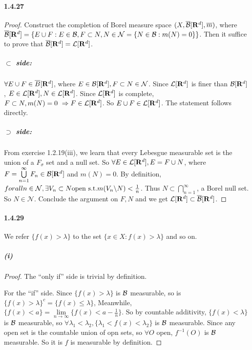 \documentclass{article}
\begin{document}
\paragraph{1.4.27}
\begin{proof}
Construct the completion of Borel measure space $(X,\overline{\mathcal{B}}[\mathbf{R}^d],\overline{m})$, where $\overline{\mathcal{B}}[\mathbf{R}^d]=\{E\cup F: E\in\mathcal{B}, F\subset N, N\in \mathcal{N}=\{N\in \mathcal{B}:m(N)=0\}\}$. Then it suffice to prove that $\overline{\mathcal{B}}[\mathbf{R}^d]=\mathcal{L}[\mathbf{R}^d]$.

\subparagraph{$\subset$ side:} $\forall E\cup F\in\overline{B}[\mathbf{R}^d]$, where $E\in \mathcal{B}[\mathbf{R}^d], F\subset N\in \mathcal{N}$. Since $\mathcal{L}[\mathbf{R}^d]$ is finer than $\mathcal{B}[\mathbf{R}^d]$, $E\in \mathcal{L}[\mathbf{R}^d], N\in\mathcal{L}[\mathbf{R}^d]$. Since $\mathcal{L}[\mathbf{R}^d]$ is complete, $F\subset N, m(N)=0\ \Rightarrow F\in\mathcal{L}[\mathbf{R}^d]$. So $E\cup F\in\mathcal{L}[\mathbf{R}^d]$. The statement follows directly.

\subparagraph{$\supset$ side:} From exercise 1.2.19(iii), we learn that every Lebesgue measurable set is the union of a $F_\sigma$ set and a null set. So $\forall E\in\mathcal{L}[\mathbf{R}^d], E=F\cup N$, where $F=\bigcup\limits_{n=1}^{\infty}F_n\in\mathcal{B}[\mathbf{R}^d]$ and $m(N)=0$. By definition, $forall n\in \mathcal{N}, \exists V_n\subset N \text{open}\text{ s.t.} m(V_n\backslash N)<\frac 1 n$. Thus $N\subset \bigcap\limits_{n=1}^{\infty}$, a Borel null set. So $N\in \mathcal{N}$. Conclude the argument on $F,N$ and we get $\mathcal{L}[\mathbf{R}^d]\subset \overline{\mathcal{B}}[\mathbf{R}^d]$.
\end{proof}

\paragraph{1.4.29}
We refer $\{f(x)>\lambda\}$ to the set $\{x\in X : f(x)>\lambda\}$ and so on.

\subparagraph{(i)}
\begin{proof}
The ``only if'' side is trivial by definition. 

For the ``if'' side. Since $\{f(x)>\lambda\}$ is $\mathcal{B}$ measurable, so is $\{f(x)>\lambda\}^c=\{f(x)\leq \lambda\}$,  Meanwhile, $\{f(x)<a\}=\lim\limits_{n\to\infty}\{f(x)<a-\frac 1 n\}$. So by countable additivity, $\{f(x)<\lambda\}$ is $\mathcal{B}$ measurable, so $\forall \lambda_1<\lambda_2, \{\lambda_1<f(x)<\lambda_2\} $ is $\mathcal{B}$ measurable. Since any open set is the countable union of opn sets, so $\forall O$ open, $f^{-1}(O)$ is $\mathcal{B}$ measurable. So it is $f$ is measurable by definition.
\end{proof}
\end{document}
